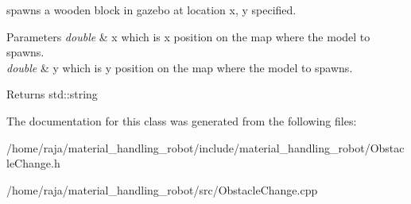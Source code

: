 spawns a wooden block in gazebo at location x, y specified. 


\begin{DoxyParams}{Parameters}
{\em double} & x which is x position on the map where the model to spawns. \\
\hline
{\em double} & y which is y position on the map where the model to spawns. \\
\hline
\end{DoxyParams}
\begin{DoxyReturn}{Returns}
std\+::string 
\end{DoxyReturn}


The documentation for this class was generated from the following files\+:\begin{DoxyCompactItemize}
\item 
/home/raja/material\+\_\+handling\+\_\+robot/include/material\+\_\+handling\+\_\+robot/Obstacle\+Change.\+h\item 
/home/raja/material\+\_\+handling\+\_\+robot/src/Obstacle\+Change.\+cpp\end{DoxyCompactItemize}
